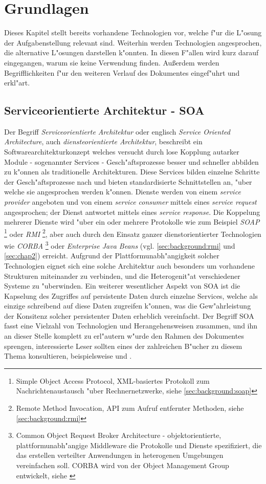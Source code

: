 \chapter{Grundlagen}
\label{sec:background}

Dieses Kapitel stellt bereits vorhandene Technologien vor, welche f"ur die L"osung der Aufgabenstellung relevant sind.
Weiterhin werden Technologien angesprochen, die alternative L"osungen darstellen k"onnten. In diesen F"allen wird kurz
darauf eingegangen, warum sie keine Verwendung finden. Au\ss erdem werden Begrifflichkeiten f"ur den weiteren Verlauf
des Dokumentes eingef"uhrt und erkl"art.

\section{Serviceorientierte Architektur - SOA}
\label{sec:background:soa}
Der Begriff \emph{Serviceorientierte Architektur} oder englisch \emph{Service Oriented Architecture}, auch \emph{diensteorientierte Architektur},
beschreibt ein Softwarearchitekturkonzept welches versucht durch lose Kopplung autarker Module - sogenannter Services -
Gesch"aftsprozesse besser und schneller abbilden zu k"onnen als traditionelle Architekturen. Diese Services bilden
einzelne Schritte der Gesch"aftsprozesse nach und bieten standardisierte Schnittstellen an, "uber welche sie angesprochen
werden k"onnen. Dienste werden von einem \emph{service provider} angeboten und von einem \emph{service consumer}
mittels eines \emph{service request} angesprochen; der Dienst antwortet mittels eines \emph{service response}.
Die Koppelung mehrerer Dienste wird "uber ein oder mehrere Protokolle wie zum Beispiel \emph{SOAP}
\footnote{Simple Object Access Protocol, XML-basiertes Protokoll zum Nachrichtenaustausch "uber Rechnernetzwerke, siehe \ref{sec:background:soap}}
oder \emph{RMI}
\footnote{Remote Method Invocation, API zum Aufruf entfernter Methoden, siehe \ref{sec:background:rmi}}, 
aber auch durch den Einsatz ganzer dienstorientierter Technologien
wie \emph{CORBA} \footnote{
Common Object Request Broker Architecture - objektorientierte, plattformunabh"angige Middleware die Protokolle und Dienste
spezifiziert, die das erstellen verteilter Anwendungen in heterogenen Umgebungen vereinfachen soll. CORBA wird von
der Object Management Group entwickelt, siehe \cite{OMGHP}}
oder \emph{Enterprise Java Beans} (vgl. \ref{sec:background:rmi} und \ref{sec:chap2}) erreicht. 
Aufgrund der Plattformunabh"angigkeit solcher Technologien eignet sich eine solche Architektur auch besonders um vorhandene
Strukturen miteinander zu verbinden, und die Heterogenit"at verschiedener Systeme zu "uberwinden.
Ein weiterer wesentlicher Aspekt von SOA ist die Kapselung des Zugriffes
auf persistente Daten durch einzelne Services, welche als einzige schreibend auf diese Daten zugreifen k"onnen, was 
die Gew"ahrleistung der Konsitenz solcher persistenter Daten erheblich vereinfacht. 
Der Begriff SOA fasst eine Vielzahl von Technologien und Herangehensweisen zusammen, und ihn an dieser Stelle komplett zu 
erl"autern w"urde den Rahmen des Dokumentes sprengen, interessierte Leser sollten eines der zahlreichen B"ucher
zu diesem Thema konsultieren, beispielsweise \cite{SOABOOK} und \cite{SOABOOK2}.

